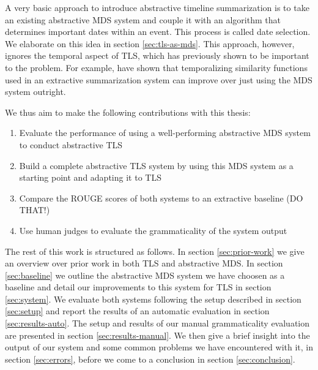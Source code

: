 \documentclass[a4paper,BCOR=10mm]{report}
\numberwithin{lemma}{chapter}
\numberwithin{definition}{chapter}
\begin{document}

A very basic approach to introduce abstractive timeline summarization is to take an existing abstractive MDS system and couple it with an algorithm that determines important dates within an event. This process is called date selection. We elaborate on this idea in section \ref{sec:tls-as-mds}. This approach, however, ignores the temporal aspect of TLS, which has previously shown to be important to the problem. For example, \citet{markert} have shown that temporalizing similarity functions used in an extractive summarization system can improve over just using the MDS system outright.

We thus aim to make the following contributions with this thesis:

\begin{enumerate}
\item{Evaluate the performance of using a well-performing abstractive MDS system to conduct abstractive TLS}
\item{Build a complete abstractive TLS system by using this MDS system as a starting point and adapting it to TLS}
\item{Compare the ROUGE scores of both systems to an extractive baseline (DO THAT!)}
\item{Use human judges to evaluate the grammaticality of the system output}
\end{enumerate}

The rest of this work is structured as follows.
In section \ref{sec:prior-work} we give an overview over prior work in both TLS and abstractive MDS.
In section \ref{sec:baseline} we outline the abstractive MDS system we have choosen as a baseline and detail our improvements to this system for TLS in section \ref{sec:system}.
We evaluate both systems following the setup described in 
section \ref{sec:setup} and report the results of an automatic evaluation in section \ref{sec:results-auto}.
The setup and results of our manual grammaticality evaluation are presented in section \ref{sec:results-manual}.
We then give a brief insight into the output of our system and some common problems we have encountered with it, in section \ref{sec:errors}, before we come to a conclusion in section \ref{sec:conclusion}.
\end{document}
